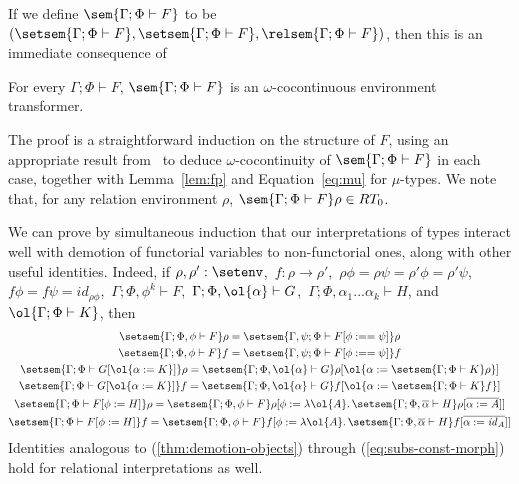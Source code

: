\documentclass{lmcs}
\theoremstyle{plain}\newtheorem{satz}[thm]{Satz}
\renewcommand{\id}{\mathit{id}}
\begin{document}
If we define $\sem{\Gamma;\Phi \vdash F}$ to be $(\setsem{\Gamma;\Phi
  \vdash F}, \setsem{\Gamma;\Phi \vdash F},\relsem{\Gamma;\Phi \vdash
  F})$, then this is an immediate consequence of
\begin{lem}\label{lem:rel-transf-morph}
For every $\Gamma;\Phi \vdash F$, $\sem{\Gamma;\Phi \vdash F}$ is an
$\omega$-cocontinuous environment transformer.

\end{lem}
\noindent
The proof is a straightforward induction on the structure of $F$,
using an appropriate result from~\cite{jp19} to deduce
$\omega$-cocontinuity of $\sem{\Gamma;\Phi \vdash F}$ in each case,
together with Lemma~\ref{lem:fp} and Equation~\ref{eq:mu} for
$\mu$-types. We note that, for any relation environment $\rho$,  
$\sem{\Gamma;\Phi \vdash F}\rho \in RT_0$.

We can prove by simultaneous induction that our interpretations of
types interact well with demotion of functorial variables to
non-functorial ones, along with other useful identities. Indeed, if
$\rho, \rho' : \setenv$, \,$f : \rho \to \rho'$, \,$\rho \phi = \rho
\psi = \rho' \phi = \rho' \psi$, \, $f \phi = f \psi = \id_{\rho
  \phi}$,\, $\Gamma; \Phi, \phi^k \vdash F$,\,
$\Gamma;\Phi,\ol{\alpha} \vdash G$,\, $\Gamma;\Phi,\alpha_1...\alpha_k
\vdash H$, and $\ol{\Gamma;\Phi \vdash K}$, then
\begin{gather}
\label{thm:demotion-objects}
\setsem{\Gamma; \Phi, \phi \vdash F} \rho = \setsem{\Gamma, \psi; \Phi
  \vdash F[\phi :== \psi] } \rho\\
\label{thm:demotion-morphisms}
\setsem{\Gamma; \Phi, \phi \vdash F} f = \setsem{\Gamma, \psi; \Phi
  \vdash F[\phi :== \psi]} f\\
\label{eq:subs-var}
\setsem{\Gamma;\Phi \vdash G[\ol{\alpha := K}]}\rho =
\setsem{\Gamma;\Phi,\ol{\alpha} \vdash G}\rho[\ol{\alpha := 
\setsem{\Gamma;\Phi \vdash K}\rho}]\\
\label{eq:subs-var-morph}
\setsem{\Gamma;\Phi \vdash G[\ol{\alpha := K}]}f =
\setsem{\Gamma;\Phi,\ol{\alpha} \vdash G}f[\ol{\alpha :=
\setsem{\Gamma;\Phi \vdash K}f}]\\
\label{eq:subs-const}
\setsem{\Gamma; \Phi \vdash F[\phi := H]}\rho
= \setsem{\Gamma; \Phi, \phi \vdash F}\rho
[\phi := \lambda \ol{A}.\, \setsem{\Gamma;\Phi,\overline{\alpha}\vdash
    H}\rho[\overline{\alpha := A}]] \\ 
\label{eq:subs-const-morph}
\setsem{\Gamma; \Phi \vdash F[\phi := H]}f
= \setsem{\Gamma; \Phi, \phi \vdash F}f
[\phi := \lambda \ol{A}.\,\setsem{\Gamma;\Phi,\overline{\alpha}\vdash
    H}f[\overline{\alpha := \id_A}]] 
\end{gather}
Identities analogous to (\ref{thm:demotion-objects}) through
(\ref{eq:subs-const-morph}) hold for relational interpretations as well.
\end{document}
